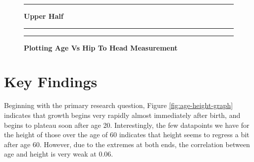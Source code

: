 \documentclass[]{article}
\begin{document}
\begin{figure}[!ht]
    \hrule
    \caption{ \textbf{Upper Half} }
    \begin{center}
    \end{center}
    \label{fig:hip-head-graph}
  \hrule
  \vspace{2.5mm}
      \caption{\textbf{ Plotting Age Vs Hip To Head Measurement }   }
      \label{fig:combined}
  \vspace{-2.5mm}
  \hrule
\end{figure}
\newpage

\section{Key Findings}
\label{sec:findings}

Beginning with the primary research question, Figure
\ref{fig:age-height-graph} indicates that growth begins very rapidly
almost immediately after birth, and begins to plateau soon after age 20.
Interestingly, the few datapoints we have for the height of those over
the age of 60 indicates that height seems to regress a bit after age 60.
However, due to the extremes at both ends, the correlation between age
and height is very weak at 0.06.
\end{document}
